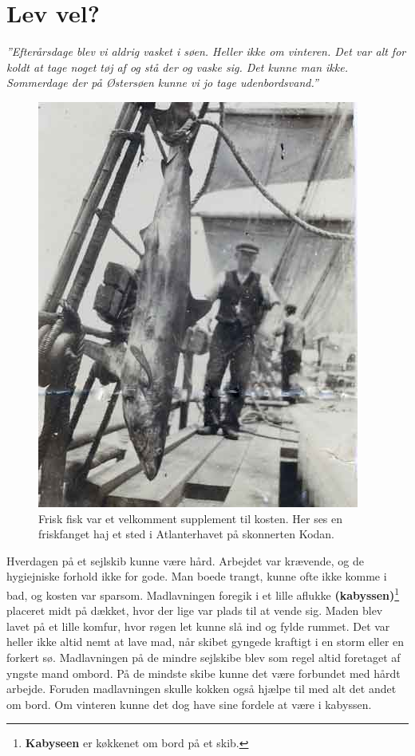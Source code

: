 \chapter{Lev vel?}

\emph{''Efterårsdage blev vi aldrig vasket i søen. Heller ikke om
vinteren. Det var alt for koldt at tage noget tøj af og stå der og vaske
sig. Det kunne man ikke. Sommerdage der på Østersøen kunne vi jo tage
udenbordsvand.''}

\begin{figure}
\centering
\includegraphics{images/sejlskibe_tema-4-haj.jpg}
\caption{Frisk fisk var et velkomment supplement til kosten. Her ses en
friskfanget haj et sted i Atlanterhavet på skonnerten Kodan.}
\end{figure}

Hverdagen på et sejlskib kunne være hård. Arbejdet var krævende, og de
hygiejniske forhold ikke for gode. Man boede trangt, kunne ofte ikke
komme i bad, og kosten var sparsom. Madlavningen foregik i et lille
aflukke \textbf{(kabyssen)}\footnote{\textbf{Kabyseen} er køkkenet om
  bord på et skib.} placeret midt på dækket, hvor der lige var plads til
at vende sig. Maden blev lavet på et lille komfur, hvor røgen let kunne
slå ind og fylde rummet. Det var heller ikke altid nemt at lave mad, når
skibet gyngede kraftigt i en storm eller en forkert sø. Madlavningen på
de mindre sejlskibe blev som regel altid foretaget af yngste mand
ombord. På de mindste skibe kunne det være forbundet med hårdt arbejde.
Foruden madlavningen skulle kokken også hjælpe til med alt det andet om
bord. Om vinteren kunne det dog have sine fordele at være i kabyssen.

